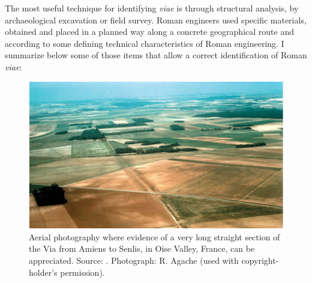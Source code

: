 	
	The most useful technique for identifying \textit{viae} is through structural analysis, by archaeological excavation or field survey. Roman engineers used specific materials, obtained and placed in a planned way along a concrete geographical route and according to some defining technical characteristics of Roman engineering. I summarize below some of those items that allow a correct identification of Roman \textit{viae}:
	
	\begin{figure}[!htb]
		\includegraphics[width=\linewidth]{figures/verdu_Fig1}
		\caption{Aerial photography where evidence of a very long straight section of the Via from Amiens to Senlis, in Oise Valley, France, can be appreciated. Source: \textcite[147]{Moreno_2004}. Photograph: R. Agache (used with copyright-holder’s permission).}
		\label{fig:verdu_Fig1}
	\end{figure}
	
